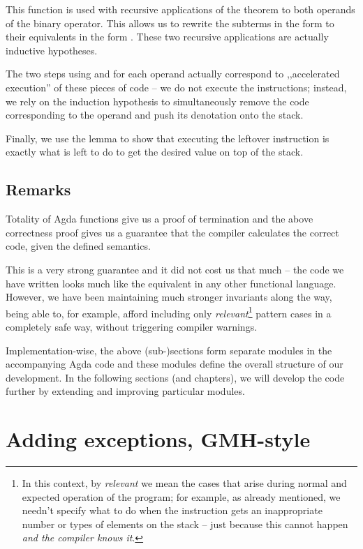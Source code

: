 \noindent This function is used with recursive applications of the theorem
 to both operands of the binary operator. This allows us
to rewrite the subterms in the form 
to their equivalents in the form . These
two recursive applications are actually inductive hypotheses.

The two steps using  and  for each operand
actually correspond to ,,accelerated execution'' of these pieces of code -- we
do not execute the instructions; instead, we rely on the induction hypothesis
to simultaneously remove the code corresponding to the operand and push its
denotation onto the stack.

Finally, we use the lemma  to show that executing the
leftover instruction is exactly what is left to do to get the desired value
on top of the stack.

\subsection{Remarks}

Totality of Agda functions give us a proof of termination and the above
correctness proof gives us a guarantee that the compiler calculates the correct
code, given the defined semantics.

This is a very strong guarantee and it did not cost us that much -- the code we
have written looks much like the equivalent in any other functional language.
However, we have been maintaining much stronger invariants along the way, being
able to, for example, afford including only \emph{relevant}\footnote{In this
  context, by \emph{relevant} we mean the cases that arise during normal and
  expected operation of the program; for example, as already mentioned, we
needn't specify what to do when the instruction  gets an
inappropriate number or types of elements on the stack -- just because this
cannot happen \emph{and the compiler knows it}.} pattern cases in a completely
safe way, without triggering compiler warnings.

Implementation-wise, the above (sub-)sections form separate modules in the
accompanying Agda code and these modules define the overall structure of our
development. In the following sections (and chapters), we will develop
the code further by extending and improving particular modules.

\section{Adding exceptions, GMH-style}

